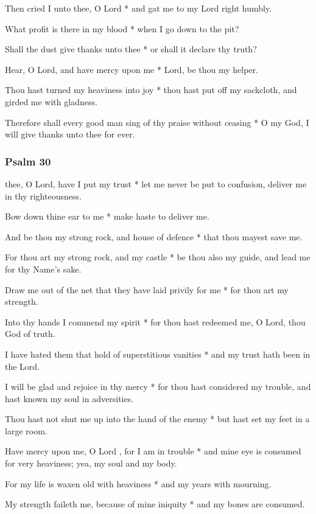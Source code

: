Then cried I unto thee, O Lord * and gat me to my Lord right humbly.

What profit is there in my blood * when I go down to the pit?

Shall the dust give thanks unto thee * or shall it declare thy truth?

Hear, O Lord, and have mercy upon me * Lord, be thou my helper.

Thou hast turned my heaviness into joy * thou hast put off my sackcloth, and girded me with gladness.

Therefore shall every good man sing of thy praise without ceasing * O my God, I will give thanks unto thee for ever.

\subsubsection{Psalm 30}


 thee, O Lord, have I put my trust * let me never be put to confusion, deliver me in thy righteousness.

Bow down thine ear to me * make haste to deliver me.

And be thou my strong rock, and house of defence * that thou mayest save me.

For thou art my strong rock, and my castle * be thou also my guide, and lead me for thy Name's sake.

Draw me out of the net that they have laid privily for me * for thou art my strength.

Into thy hands I commend my spirit * for thou hast redeemed me, O Lord, thou God of truth.

I have hated them that hold of superstitious vanities * and my trust hath been in the Lord.

I will be glad and rejoice in thy mercy * for thou hast considered my trouble, and hast known my soul in adversities.

Thou hast not shut me up into the hand of the enemy * but hast set my feet in a large room.

Have mercy upon me, O Lord , for I am in trouble * and mine eye is consumed for very heaviness; yea, my soul and my body.

For my life is waxen old with heaviness * and my years with mourning.

My strength faileth me, because of mine iniquity * and my bones are consumed.

